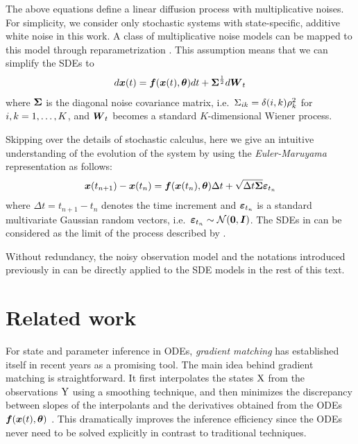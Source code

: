 The above equations define a linear diffusion process with multiplicative noises.
For simplicity, we consider only stochastic systems with state-specific, additive white noise in this work.
A class of multiplicative noise models can be mapped to this model through reparametrization \citep{vrettas2011estimating}.
This assumption means that we can simplify the SDEs to 
\begin{align}
    d\boldsymbol{x}(t) = \boldsymbol{f}(\boldsymbol{x}(t), \boldsymbol{\theta}) dt + \boldsymbol{\Sigma}^{\frac{1}{2}} d\boldsymbol{W}_t
    \label{eq-sdes}
\end{align} 
where $\boldsymbol{\Sigma}$ is the diagonal noise covariance matrix, i.e.\ $\Sigma_{ik} = \delta(i,k)\rho_k^2$ for $i, k = 1,\dots,K$, and $\boldsymbol{W}_t$ becomes a standard $K$-dimensional Wiener process.

Skipping over the details of stochastic calculus, here we give an intuitive understanding of the evolution of the system by using the \emph{Euler-Maruyama} \citep{higham2001algorithmic} representation as follows:
\begin{align}
    \boldsymbol{x}(t_{n+1}) - \boldsymbol{x}(t_{n}) = \boldsymbol{f}(\boldsymbol{x}(t_{n}), \boldsymbol{\theta}) \Delta t + 
    \sqrt{\Delta t \boldsymbol{\Sigma}} \boldsymbol{\varepsilon}_{t_n}
    \label{eq-sdes-euler-maruyama}
\end{align}
where $\Delta t = t_{n+1} - t_{n}$ denotes the time increment and ${\boldsymbol{\varepsilon}}_{t_n}$ is a standard multivariate Gaussian random vectors, i.e.\ ${\boldsymbol{\varepsilon}}_{t_n} \sim \mathcal{N}(\boldsymbol{0}, \boldsymbol{I})$.
The SDEs in  can be considered as the limit of the process described by  \citep{archambeau2007gaussian}.

Without redundancy, the noisy observation model and the notations introduced previously in  can be directly applied to the SDE models in the rest of this text.

\section{Related work}
\label{sec-related}

For state and parameter inference in ODEs, \emph{gradient matching} has established itself in recent years as a promising tool.
The main idea behind gradient matching is straightforward.
It first interpolates the states $\mathrm{X}$ from the observations $\mathrm{Y}$ using a smoothing technique, and then minimizes the discrepancy between slopes of the interpolants and the derivatives obtained from the ODEs $\boldsymbol{f}(\boldsymbol{x}(t), \boldsymbol{\theta})$ \citep{macdonald2015gradient}.
This dramatically improves the inference efficiency since the ODEs never need to be solved explicitly in contrast to traditional techniques.

